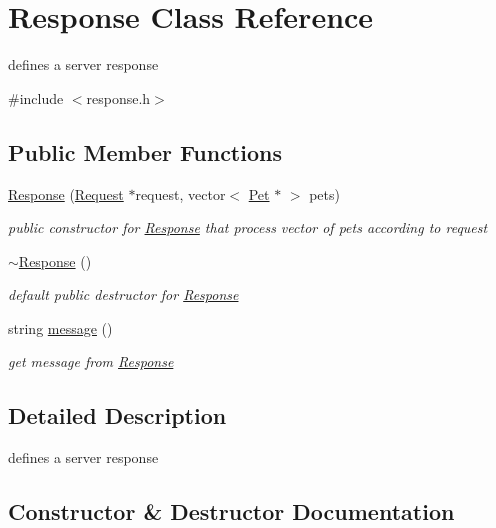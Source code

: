\hypertarget{classResponse}{}\section{Response Class Reference}
\label{classResponse}


defines a server response  




{\ttfamily \#include $<$response.\+h$>$}

\subsection*{Public Member Functions}
\begin{DoxyCompactItemize}
\item 
\hyperlink{classResponse_a4aa348a5a74a51eae1483b7a0f7fcea3}{Response} (\hyperlink{classRequest}{Request} $\ast$request, vector$<$ \hyperlink{classPet}{Pet} $\ast$ $>$ pets)
\begin{DoxyCompactList}\small\item\em public constructor for \hyperlink{classResponse}{Response} that process vector of pets according to request \end{DoxyCompactList}\item 
\hyperlink{classResponse_a2a4a6403aaefce73725f17cf63896f84}{$\sim$\+Response} ()\hypertarget{classResponse_a2a4a6403aaefce73725f17cf63896f84}{}\label{classResponse_a2a4a6403aaefce73725f17cf63896f84}

\begin{DoxyCompactList}\small\item\em default public destructor for \hyperlink{classResponse}{Response} \end{DoxyCompactList}\item 
string \hyperlink{classResponse_a517690400a7b7091d03e917f335f7f28}{message} ()
\begin{DoxyCompactList}\small\item\em get message from \hyperlink{classResponse}{Response} \end{DoxyCompactList}\end{DoxyCompactItemize}


\subsection{Detailed Description}
defines a server response 

\subsection{Constructor \& Destructor Documentation}
